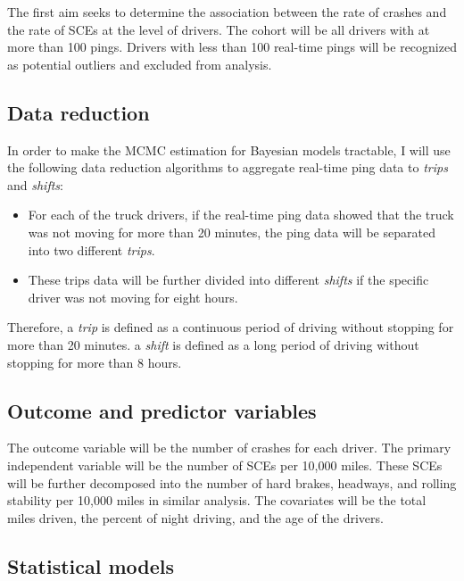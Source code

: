 \documentclass[12pt]{book}
\numberwithin{equation}{chapter}
\providecommand{\tightlist}{%
  \setlength{\itemsep}{0pt}\setlength{\parskip}{0pt}}
\begin{document}
The first aim seeks to determine the association between the rate of crashes and the rate of SCEs at the level of drivers. The cohort will be all drivers with at more than 100 pings. Drivers with less than 100 real-time pings will be recognized as potential outliers and excluded from analysis.

\hypertarget{data-reduction}{%
\subsection{Data reduction}\label{data-reduction}}

In order to make the MCMC estimation for Bayesian models tractable, I will use the following data reduction algorithms to aggregate real-time ping data to \emph{trips} and \emph{shifts}:

\begin{itemize}
\tightlist
\item
  For each of the truck drivers, if the real-time ping data showed that the truck was not moving for more than 20 minutes, the ping data will be separated into two different \emph{trips}.
\item
  These trips data will be further divided into different \emph{shifts} if the specific driver was not moving for eight hours.
\end{itemize}

Therefore, a \emph{trip} is defined as a continuous period of driving without stopping for more than 20 minutes. a \emph{shift} is defined as a long period of driving without stopping for more than 8 hours.

\hypertarget{outcome-and-predictor-variables}{%
\subsection{Outcome and predictor variables}\label{outcome-and-predictor-variables}}

The outcome variable will be the number of crashes for each driver. The primary independent variable will be the number of SCEs per 10,000 miles. These SCEs will be further decomposed into the number of hard brakes, headways, and rolling stability per 10,000 miles in similar analysis. The covariates will be the total miles driven, the percent of night driving, and the age of the drivers.

\hypertarget{statistical-models}{%
\subsection{Statistical models}\label{statistical-models}}
\end{document}
